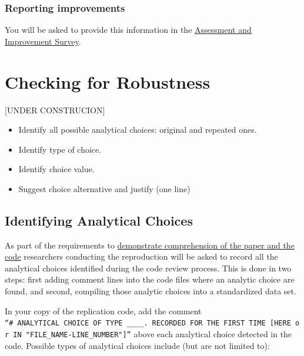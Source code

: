 \documentclass[]{book}
\providecommand{\tightlist}{%
  \setlength{\itemsep}{0pt}\setlength{\parskip}{0pt}}
\begin{document}
\hypertarget{reporting-improvements}{%
\subsection{Reporting improvements}\label{reporting-improvements}}

You will be asked to provide this information in the \href{ADD\%20LINK}{Assessment and Improvement Survey}.

\hypertarget{robust}{%
\chapter{Checking for Robustness}\label{robust}}

{[}UNDER CONSTRUCION{]}

\begin{itemize}
\tightlist
\item
  Identify all possible analytical choices: original and repeated ones.\\
\item
  Identify type of choice.\\
\item
  Identify choice value.
\item
  Suggest choice alternative and justify (one line)
\end{itemize}

\hypertarget{id-analy}{%
\section{Identifying Analytical Choices}\label{id-analy}}

As part of the requirements to \href{requirements_comprehension.md}{demonstrate comprehension of the paper and the code} researchers conducting the reproduction will be asked to record all the analytical choices identified during the code review process. This is done in two steps: first adding comment lines into the code files where an analytic choice are found, and second, compiling those analytic choices into a standardized data set.

In your copy of the replication code, add the comment \texttt{“\#\ ANALYTICAL\ CHOICE\ OF\ TYPE\ \_\_\_\_.\ RECORDED\ FOR\ THE\ FIRST\ TIME\ {[}HERE\ or\ IN\ "FILE\_NAME-LINE\_NUMBER"{]}”} above each analytical choice detected in the code. Possible types of analytical choices include (but are not limited to):
\end{document}
